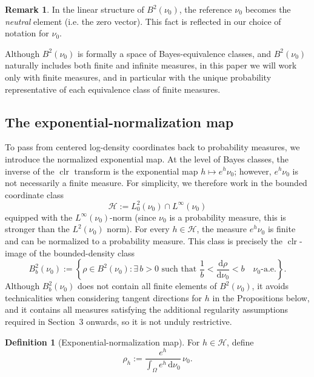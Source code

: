 \documentclass{article}
\theoremstyle{definition}
\newtheorem{definition}[theorem]{Definition}
\newtheorem{remark}[theorem]{Remark}
\DeclareMathOperator{\clr}{clr}
\renewcommand{\d}{\mathrm{d}}
\begin{document}
\begin{remark}
    In the linear structure of $B^2(\nu_0)$, the reference $\nu_0$ becomes the \emph{neutral} element (i.e. the zero vector). This fact is reflected in our choice of notation for $\nu_0$.
\end{remark}

Although \(B^2(\nu_0)\) is formally a space of Bayes-equivalence classes, and \(B^2(\nu_0)\) naturally includes both finite and infinite measures, in this paper we will work only with finite measures, and in particular with the unique probability representative of each equivalence class of finite measures.

\subsection{The exponential-normalization map}
\label{subsec:exp-normalization}

To pass from centered log-density coordinates back to probability measures, we introduce the
normalized exponential map. 
At the level of Bayes classes, the inverse of the $\clr$ transform is the exponential map \(h \mapsto e^h \nu_0\); however, $e^h \nu_0$ is not necessarily a finite measure. 
For simplicity, we therefore work in the bounded coordinate class
\[
    \mathcal{H} := L^2_0(\nu_0) \cap L^\infty(\nu_0)
\]
equipped with the $L^\infty(\nu_0)$-norm (since $\nu_0$ is a probability measure, this is stronger than the $L^2(\nu_0)$ norm). For every \(h \in \mathcal{H}\), the measure \(e^h \nu_0\) is finite and can be normalized to a probability
measure. This class is precisely the $\clr$-image of the bounded-density class
\citep{van_den_boogaart_bayes_2014}
\[
    B^2_b(\nu_0)
    :=
    \left\{
    \rho \in B^2(\nu_0) :
    \exists\, b>0 \text{ such that }
    \frac{1}{b}
    <
    \frac{\d\rho}{\d\nu_0}
    <
    b
    \quad \nu_0\text{-a.e.}
    \right\}.
\]
Although \(B^2_b(\nu_0)\) does not contain all finite elements of \(B^2(\nu_0)\), it avoids technicalities when considering tangent directions for $h$ in the Propositions below, and it contains all measures satisfying the additional regularity assumptions required in Section~3 onwards, so it is not unduly restrictive.

\begin{definition}[Exponential-normalization map] For $h \in \mathcal{H}$, define
    \begin{equation}
        \label{eq:rho_h_def}
        \rho_h
        :=
        \frac{e^h}{\int_\Omega e^h\,\d\nu_0}\,\nu_0.
    \end{equation}
\end{definition}
\end{document}

